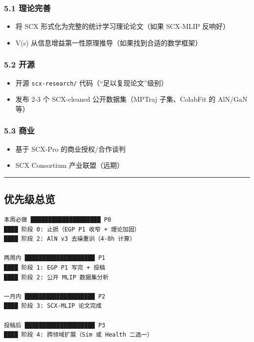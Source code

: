 \documentclass[
  12pt,
]{ctexart}
\providecommand{\tightlist}{%
  \setlength{\itemsep}{0pt}\setlength{\parskip}{0pt}}
\begin{document}
\subsubsection{5.1 理论完善}\label{ux7406ux8bbaux5b8cux5584}

\begin{itemize}
\tightlist
\item[$\square$]
  将 SCX 形式化为完整的统计学习理论论文（如果 SCX-MLIP 反响好）
\item[$\square$]
  V(s) 从信息增益第一性原理推导（如果找到合适的数学框架）
\end{itemize}

\subsubsection{5.2 开源}\label{ux5f00ux6e90}

\begin{itemize}
\tightlist
\item[$\square$]
  开源 \texttt{scx-research/} 代码（``足以复现论文''级别）
\item[$\square$]
  发布 2-3 个 SCX-cleaned 公开数据集（MPTraj 子集、ColabFit 的 AlN/GaN
  等）
\end{itemize}

\subsubsection{5.3 商业}\label{ux5546ux4e1a}

\begin{itemize}
\tightlist
\item[$\square$]
  基于 SCX-Pro 的商业授权/合作谈判
\item[$\square$]
  SCX Consortium 产业联盟（远期）
\end{itemize}

\begin{center}\rule{0.5\linewidth}{0.5pt}\end{center}

\subsection{优先级总览}\label{ux4f18ux5148ux7ea7ux603bux89c8}

\begin{verbatim}
本周必做 ████████████████████ P0
████ 阶段 0: 止损（EGP P1 收窄 + 理论加固）
████ 阶段 2: AlN v3 去噪重训（4-8h 计算）

两周内 ████████████████████ P1
████ 阶段 1: EGP P1 写完 + 投稿
████ 阶段 2: 公开 MLIP 数据集分析

一月内 ████████████████████ P2
████ 阶段 3: SCX-MLIP 论文完成

投稿后 ████████████████████ P3
████ 阶段 4: 跨领域扩展（Sim 或 Health 二选一）
\end{verbatim}
\end{document}
